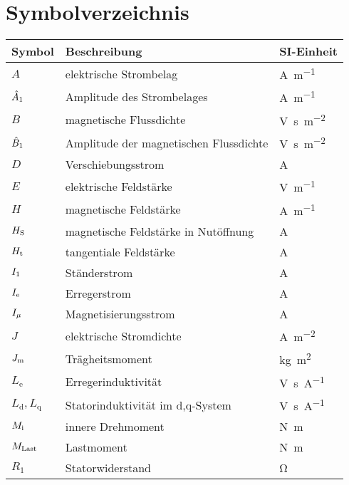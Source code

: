 \cleardoublepage
\chapter*{Symbolverzeichnis}\label{s.sym}
\begin{tabularx}{\textwidth}{lll}
\toprule
Symbol & Beschreibung	& SI-Einheit\\
\midrule
$A$			&	elektrische Strombelag  	&  	\si{\ampere\per\meter} \\
$\hat{A}_{\mathrm{1}}$			&	Amplitude des Strombelages  	&  	\si{\ampere\per\meter} \\ 
$B$			&	magnetische Flussdichte		&	\si{\volt\second\per\square\meter} \\
$\hat{B}_{\mathrm{1}}$	 &	Amplitude der magnetischen Flussdichte 	&  	\si{\volt\second\per\square\meter} \\ 
$D$ & Verschiebungsstrom &  \si{\ampere} \\
$E$ & elektrische Feldstärke & \si{\volt\per\meter} \\
$H$			&	magnetische Feldstärke		&	\si{\ampere\per\meter}\\
$H_{\mathrm{S}}$	&   magnetische Feldstärke in Nutöffnung	&	\si{\ampere} \\
$H_{\mathrm{t}}$	&   tangentiale Feldstärke	&	\si{\ampere} \\
$I_{\mathrm{1}}$	&	Ständerstrom	&	\si{\ampere} \\
$I_{\mathrm{e}}$	&	Erregerstrom	&	\si{\ampere} \\
$I_{\mathrm{\mu}}$	&	Magnetisierungsstrom	&	\si{\ampere} \\
$J$			&	elektrische Stromdichte		&	\si{\ampere\per\square\meter} \\
$J_{\mathrm{m}}$			&	Trägheitsmoment	&	\si{\kilogram\square\meter} \\
$L_\mathrm{e}$	& 	Erregerinduktivität & \si{\volt\second\per\ampere}\\
$L_\mathrm{d}, L_\mathrm{q}$	& 	Statorinduktivität im d,q-System & \si{\volt\second\per\ampere}\\
$M_{\mathrm{i}}$			&	innere Drehmoment		&	\si{\newton\meter} \\
$M_{\mathrm{Last}}$			&	Lastmoment		&	\si{\newton\meter} \\
$R_\mathrm{1}$		&	Statorwiderstand			&	\si{\ohm} \\

\end{tabularx}
